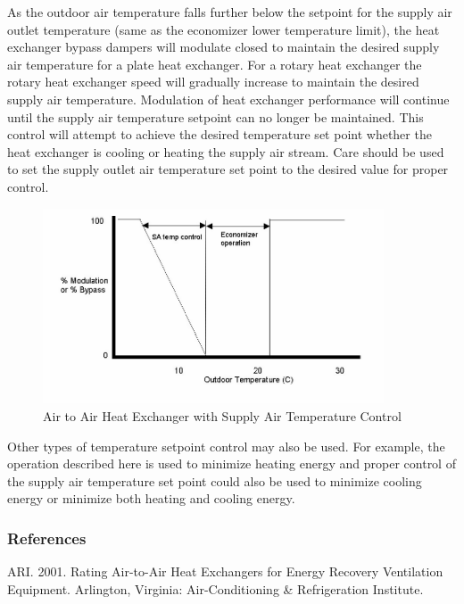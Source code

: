As the outdoor air temperature falls further below the setpoint for the supply air outlet temperature (same as the economizer lower temperature limit), the heat exchanger bypass dampers will modulate closed to maintain the desired supply air temperature for a plate heat exchanger. For a rotary heat exchanger the rotary heat exchanger speed will gradually increase to maintain the desired supply air temperature. Modulation of heat exchanger performance will continue until the supply air temperature setpoint can no longer be maintained. This control will attempt to achieve the desired temperature set point whether the heat exchanger is cooling or heating the supply air stream. Care should be used to set the supply outlet air temperature set point to the desired value for proper control.

\begin{figure}[hbtp] %
\centering
\includegraphics[width=0.9\textwidth, height=0.9\textheight, keepaspectratio=true]{media/image5550.png}
\caption{  Air to Air Heat Exchanger with Supply Air Temperature Control \protect \label{fig:air-to-air-heat-exchanger-with-supply-air}}
\end{figure}

Other types of temperature setpoint control may also be used. For example, the operation described here is used to minimize heating energy and proper control of the supply air temperature set point could also be used to minimize cooling energy or minimize both heating and cooling energy.

\subsubsection{References}\label{references-027}

ARI. 2001. Rating Air-to-Air Heat Exchangers for Energy Recovery Ventilation Equipment. Arlington, Virginia: Air-Conditioning \& Refrigeration Institute.

